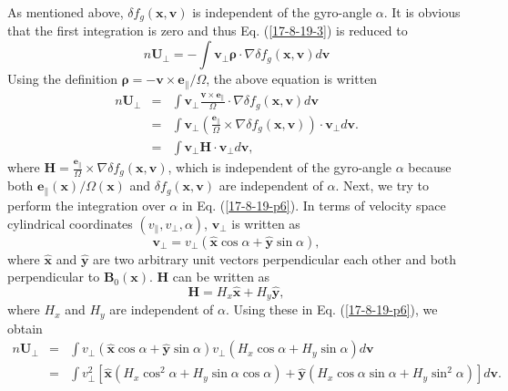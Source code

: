 \documentclass{llncs}
\newcommand{\tmmathbf}[1]{\ensuremath{\boldsymbol{#1}}}
\begin{document}
As mentioned above, $\delta f_g (\mathbf{x}, \mathbf{v})$ is independent of
the gyro-angle $\alpha$. It is obvious that the first integration is zero and
thus Eq. (\ref{17-8-19-3}) is reduced to
\begin{equation}
  n\mathbf{U}_{\perp} = - \int \mathbf{v}_{\perp} \tmmathbf{\rho} \cdot \nabla
  \delta f_g (\mathbf{x}, \mathbf{v}) d\mathbf{v}
\end{equation}
Using the definition $\tmmathbf{\rho}= -\mathbf{v} \times
\mathbf{e}_{\parallel} / \Omega$, the above equation is written
\begin{eqnarray}
  n\mathbf{U}_{\perp} & = & \int \mathbf{v}_{\perp} \frac{\mathbf{v} \times
  \mathbf{e}_{\parallel}}{\Omega} \cdot \nabla \delta f_g (\mathbf{x},
  \mathbf{v}) d\mathbf{v} \nonumber\\
  & = & \int \mathbf{v}_{\perp} \left( \frac{\mathbf{e}_{\parallel}}{\Omega}
  \times \nabla \delta f_g (\mathbf{x}, \mathbf{v}) \right) \cdot
  \mathbf{v}_{\perp} d\mathbf{v}. \nonumber\\
  & = & \int \mathbf{v}_{\perp} \mathbf{H} \cdot \mathbf{v}_{\perp}
  d\mathbf{v},  \label{17-8-19-p6}
\end{eqnarray}
where $\mathbf{H}= \frac{\mathbf{e}_{\parallel}}{\Omega} \times \nabla \delta
f_g (\mathbf{x}, \mathbf{v})$, which is independent of the gyro-angle $\alpha$
because both $\mathbf{e}_{\parallel} (\mathbf{x}) / \Omega (\mathbf{x})$ and
$\delta f_g (\mathbf{x}, \mathbf{v})$ are independent of $\alpha$. Next, we
try to perform the integration over $\alpha$ in Eq. (\ref{17-8-19-p6}). In
terms of velocity space cylindrical coordinates $(v_{\parallel}, v_{\perp},
\alpha)$, $\mathbf{v}_{\perp}$ is written as
\begin{equation}
  \mathbf{v}_{\perp} = v_{\perp} (\hat{\mathbf{x}} \cos \alpha +
  \hat{\mathbf{y}} \sin \alpha),
\end{equation}
where $\hat{\mathbf{x}}$ and $\hat{\mathbf{y}}$ are two arbitrary unit vectors
perpendicular each other and both perpendicular to $\mathbf{B}_0
(\mathbf{x})$. $\mathbf{H}$ can be written as
\begin{equation}
  \mathbf{H}= H_x \hat{\mathbf{x}} + H_y \hat{\mathbf{y}},
\end{equation}
where $H_x$ and $H_y$ are independent of $\alpha$. Using these in Eq.
(\ref{17-8-19-p6}), we obtain
\begin{eqnarray}
  n\mathbf{U}_{\perp} & = & \int v_{\perp} (\hat{\mathbf{x}} \cos \alpha +
  \hat{\mathbf{y}} \sin \alpha) v_{\perp} (H_x \cos \alpha + H_y \sin \alpha)
  d\mathbf{v} \nonumber\\
  & = & \int v_{\perp}^2 [\hat{\mathbf{x}} (H_x \cos^2 \alpha + H_y \sin
  \alpha \cos \alpha) + \hat{\mathbf{y}} (H_x \cos \alpha \sin \alpha + H_y
  \sin^2 \alpha)] d\mathbf{v}. 
\end{eqnarray}
\end{document}
